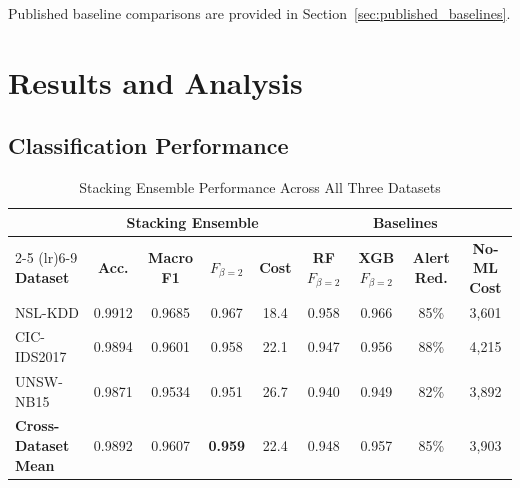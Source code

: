 \documentclass[conference]{IEEEtran}
\begin{document}
Published baseline comparisons are provided in Section~\ref{sec:published_baselines}.

\section{Results and Analysis}
\label{sec:results}

\subsection{Classification Performance}

\begin{table}[t]
\centering
\caption{Stacking Ensemble Performance Across All Three Datasets}
\label{tab:results}
\renewcommand{\arraystretch}{1.1}
\begin{tabular}{l cccc cccc}
\toprule
 & \multicolumn{4}{c}{\textbf{Stacking Ensemble}} & \multicolumn{4}{c}{\textbf{Baselines}} \\
\cmidrule(lr){2-5} \cmidrule(lr){6-9}
\textbf{Dataset} & \textbf{Acc.} & \textbf{Macro F1} & \textbf{$F_{\beta=2}$} & \textbf{Cost} & \textbf{RF $F_{\beta=2}$} & \textbf{XGB $F_{\beta=2}$} & \textbf{Alert Red.} & \textbf{No-ML Cost} \\
\midrule
NSL-KDD      & 0.9912 & 0.9685 & 0.967 & 18.4 & 0.958 & 0.966 & 85\% & 3{,}601 \\
CIC-IDS2017  & 0.9894 & 0.9601 & 0.958 & 22.1 & 0.947 & 0.956 & 88\% & 4{,}215 \\
UNSW-NB15    & 0.9871 & 0.9534 & 0.951 & 26.7 & 0.940 & 0.949 & 82\% & 3{,}892 \\
\midrule
\textbf{Cross-Dataset Mean} & 0.9892 & 0.9607 & \textbf{0.959} & 22.4 & 0.948 & 0.957 & 85\% & 3{,}903 \\
\bottomrule
\end{tabular}
\end{table}
\end{document}
